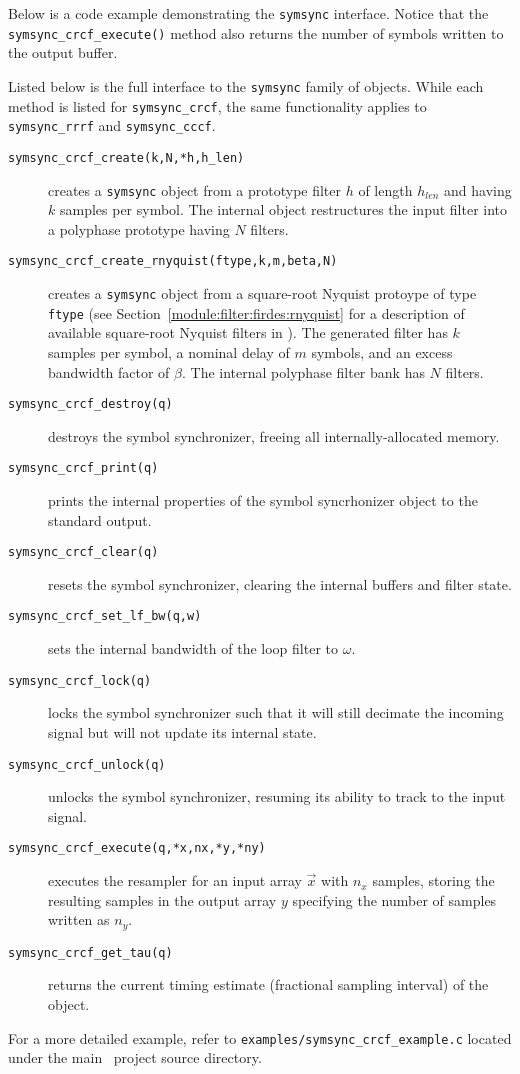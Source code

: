 Below is a code example demonstrating the {\tt symsync} interface.
Notice that the {\tt symsync\_crcf\_execute()} method also returns the
number of symbols written to the output buffer.
%

%
Listed below is the full interface to the {\tt symsync} family of
objects.
While each method is listed for {\tt symsync\_crcf}, the same
functionality applies to {\tt symsync\_rrrf} and {\tt symsync\_cccf}.
%
\begin{description}
\item[{\tt symsync\_crcf\_create(k,N,*h,h\_len)}]
    creates a {\tt symsync} object from a prototype filter $h$ of length
    $h_{len}$ and having $k$ samples per symbol.
    The internal object restructures the input filter into a polyphase
    prototype having $N$ filters.
\item[{\tt symsync\_crcf\_create\_rnyquist(ftype,k,m,beta,N)}]
    creates a {\tt symsync} object from a square-root Nyquist protoype
    of type {\tt ftype} (see Section~\ref{module:filter:firdes:rnyquist}
    for a description of available square-root Nyquist filters in
    \liquid).
    The generated filter has $k$ samples per symbol,
    a nominal delay of $m$ symbols, and an excess bandwidth factor of
    $\beta$.
    The internal polyphase filter bank has $N$ filters.
\item[{\tt symsync\_crcf\_destroy(q)}]
    destroys the symbol synchronizer, freeing all internally-allocated
    memory.
\item[{\tt symsync\_crcf\_print(q)}]
    prints the internal properties of the symbol syncrhonizer object to
    the standard output.
\item[{\tt symsync\_crcf\_clear(q)}]
    resets the symbol synchronizer, clearing the internal buffers and
    filter state.
\item[{\tt symsync\_crcf\_set\_lf\_bw(q,w)}]
    sets the internal bandwidth of the loop filter to $\omega$.
\item[{\tt symsync\_crcf\_lock(q)}]
    locks the symbol synchronizer such that it will still decimate the
    incoming signal but will not update its internal state.
\item[{\tt symsync\_crcf\_unlock(q)}]
    unlocks the symbol synchronizer, resuming its ability to track to
    the input signal.
\item[{\tt symsync\_crcf\_execute(q,*x,nx,*y,*ny)}]
    executes the resampler for an input array $\vec{x}$ with $n_x$
    samples,
    storing the resulting samples in the output array $y$
    specifying the number of samples written as $n_y$.
\item[{\tt symsync\_crcf\_get\_tau(q)}]
    returns the current timing estimate (fractional sampling interval)
    of the object.
\end{description}
%
For a more detailed example, refer to
{\tt examples/symsync\_crcf\_example.c}
located under the main \liquid\ project source directory.

